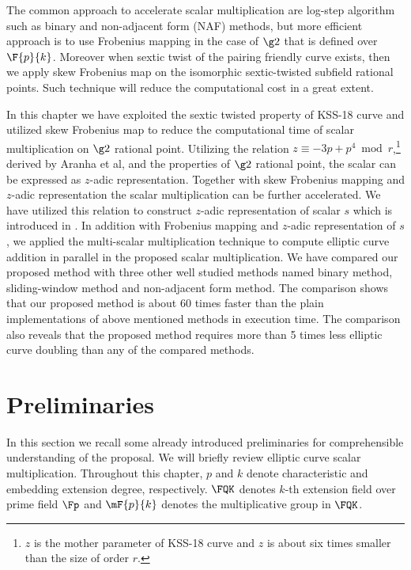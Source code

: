 The common approach to accelerate scalar multiplication are log-step algorithm such as binary and non-adjacent form (NAF) methods, but more efficient approach is to use Frobenius mapping in the case of $\g2$ that is defined over $\F{p}{k}$.
Moreover when sextic twist of the pairing friendly curve exists, then we apply skew Frobenius map on the isomorphic sextic-twisted subfield rational points. Such technique will reduce the computational cost in a great extent.

In this chapter we have exploited the sextic twisted property of KSS-18 curve and utilized skew Frobenius map to reduce the computational time of scalar multiplication on $\g2$ rational point. 
Utilizing the relation $z \equiv -3p + p^4 \bmod {r}$,\footnote{$z$ is the mother parameter of KSS-18 curve and $z$ is about six times smaller than the size of order $r$.} derived by Aranha et al,\cite{PAIRING:AFKMR12} and the properties of $\g2$ rational point, the scalar can be expressed as $z$-adic representation.
Together with skew Frobenius mapping and $z$-adic representation the scalar multiplication can be further accelerated.  
We have utilized this relation to construct $z$-adic representation of scalar $s$ which is introduced in . 
In addition with Frobenius mapping and $z$-adic representation of $s$, we applied the multi-scalar multiplication technique to compute elliptic curve addition in parallel in the proposed scalar multiplication.
We have compared our proposed method with three other well studied methods named binary method, sliding-window method and non-adjacent form method. 
The comparison shows that our proposed method is about 60 times faster than the plain implementations of above mentioned methods in execution time. The comparison also reveals that the proposed method requires more than 5 times less elliptic curve doubling than any of the compared methods.



\section{Preliminaries}
In this section we recall some already introduced preliminaries for comprehensible understanding of the proposal. 
We will briefly review elliptic curve scalar multiplication. 
Throughout this chapter, $p$ and $k$ denote characteristic and embedding extension degree, respectively. $\FQK$ denotes $k$-th extension field over prime field $\Fp$ and $\mF{p}{k}$ denotes the multiplicative group in $\FQK$.

